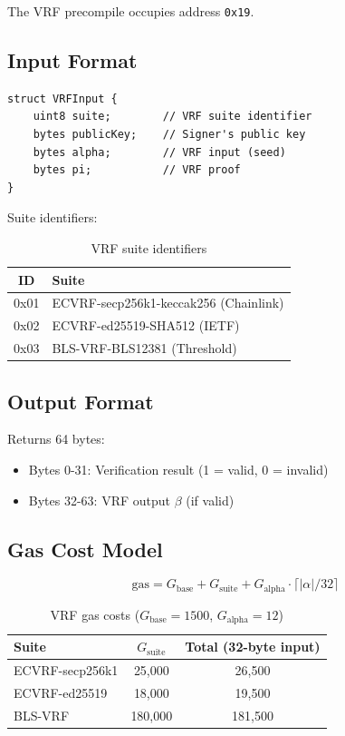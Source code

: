 \documentclass[11pt,a4paper]{article}
\theoremstyle{definition}
\begin{document}
The VRF precompile occupies address \texttt{0x19}.

\subsection{Input Format}

\begin{lstlisting}
struct VRFInput {
    uint8 suite;        // VRF suite identifier
    bytes publicKey;    // Signer's public key
    bytes alpha;        // VRF input (seed)
    bytes pi;           // VRF proof
}
\end{lstlisting}

Suite identifiers:
\begin{table}[h]
\centering
\begin{tabular}{cl}
\toprule
\textbf{ID} & \textbf{Suite} \\
\midrule
0x01 & ECVRF-secp256k1-keccak256 (Chainlink) \\
0x02 & ECVRF-ed25519-SHA512 (IETF) \\
0x03 & BLS-VRF-BLS12381 (Threshold) \\
\bottomrule
\end{tabular}
\caption{VRF suite identifiers}
\label{tab:suites}
\end{table}

\subsection{Output Format}

Returns 64 bytes:
\begin{itemize}
    \item Bytes 0-31: Verification result (1 = valid, 0 = invalid)
    \item Bytes 32-63: VRF output $\beta$ (if valid)
\end{itemize}

\subsection{Gas Cost Model}

\begin{equation}
\text{gas} = G_{\text{base}} + G_{\text{suite}} + G_{\text{alpha}} \cdot \lceil |\alpha| / 32 \rceil
\end{equation}

\begin{table}[h]
\centering
\begin{tabular}{lcc}
\toprule
\textbf{Suite} & $G_{\text{suite}}$ & \textbf{Total (32-byte input)} \\
\midrule
ECVRF-secp256k1 & 25,000 & 26,500 \\
ECVRF-ed25519 & 18,000 & 19,500 \\
BLS-VRF & 180,000 & 181,500 \\
\bottomrule
\end{tabular}
\caption{VRF gas costs ($G_{\text{base}} = 1500$, $G_{\text{alpha}} = 12$)}
\label{tab:gas}
\end{table}
\end{document}
